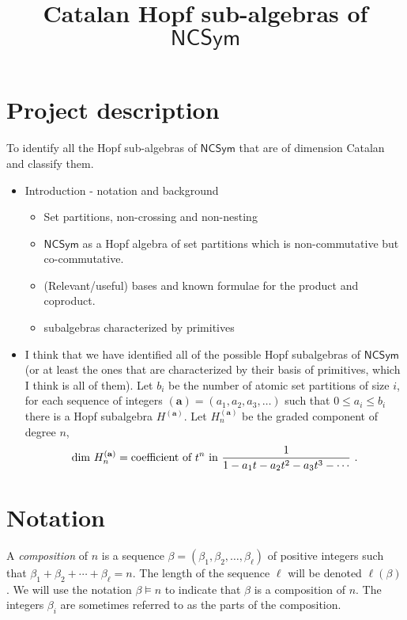 \documentclass[11pt]{amsart}
\title{Catalan Hopf sub-algebras of $\mathsf{NCSym}$}
\author{}
\newcommand{\defncolor}{\color{darkred}}
\newcommand{\defn}[1]{{\defncolor\emph{#1}}} %
\theoremstyle{definition}
\numberwithin{equation}{section}
\begin{document}
\maketitle

\section{Project description}

\noindent
To identify all the Hopf sub-algebras of $\mathsf{NCSym}$ that are of dimension Catalan and classify them.


\begin{itemize}
\item Introduction - notation and background
\cite{AT20, BBT14, BHRZ05, B08, BZ09, F12, LM11, NT05, RS06}
\cite{S09}
\begin{itemize}
\item Set partitions, non-crossing and non-nesting
\item $\mathsf{NCSym}$ as a Hopf algebra of set partitions which is non-commutative but co-commutative.
\item (Relevant/useful) bases and known formulae for the product and coproduct.
\item subalgebras characterized by primitives
\end{itemize}
\item I think that we have identified all of the possible Hopf subalgebras of $\mathsf{NCSym}$
(or at least the ones that are characterized by their basis of primitives, which I think is all of them).
Let $b_i$ be the number of atomic set partitions of size $i$, for each sequence of integers $(\mathbf{a}) = (a_1, a_2, a_3,\ldots)$ such that
$0 \leq a_i \leq b_i$ there is a Hopf subalgebra $H^{(\mathbf{a})}$.
Let $H^{(\mathbf{a})}_n$ be the graded component of degree $n$,
$$\mathrm{dim}~H^{(\mathbf{a})}_n = \hbox{coefficient of }t^n\hbox{ in }\frac{1}{1 - a_1 t - a_2 t^2 - a_3 t^3 - \cdots}~.$$
\end{itemize}

\section{Notation}

A \defn{composition} of $n$ is a sequence $\beta = (\beta_1, \beta_2, \ldots, \beta_\ell)$ of positive integers such that
$\beta_1 + \beta_2 + \cdots + \beta_\ell = n$.  The length of the sequence $\ell$ will be denoted $\ell(\beta)$.
We will use the notation $\beta \vDash n$ to indicate that $\beta$ is a composition of $n$.  The integers $\beta_i$
are sometimes referred to as the parts of the composition.
\end{document}
